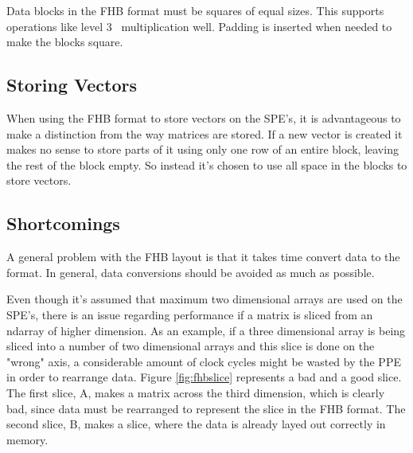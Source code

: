 Data blocks in the FHB format must be squares of equal sizes.
This supports operations like level 3 \BLAS\ multiplication well.
Padding is inserted when needed to make the blocks square. 

\subsection{Storing Vectors}
\label{sec:store_vectors}

When using the FHB format to store vectors on the SPE's, it is
advantageous to make a distinction from the way matrices are
stored. If a new vector is created it makes no sense to store parts of
it using only one row of an entire block, leaving the rest of the
block empty. So instead it's chosen to use all space in the blocks to
store vectors.

\subsection{Shortcomings}

A general problem with the FHB layout is that it takes time convert
data to the format. In general, data conversions should be avoided as
much as possible.

Even though it's assumed that maximum two dimensional arrays are used
on the SPE's, there is an issue regarding performance if a matrix is
sliced from an ndarray of higher dimension. As an example, if a three
dimensional array is being sliced into a number of two dimensional
arrays and this slice is done on the "wrong" axis, a considerable
amount of clock cycles might be wasted by the PPE in order to
rearrange data. Figure \ref{fig:fhbslice} represents a bad and a good
slice. The first slice, A, makes a matrix across the third dimension, which
is clearly bad, since data must be rearranged to represent the slice in the FHB format.
The second slice, B, makes a slice, where the data
is already layed out correctly in memory.




